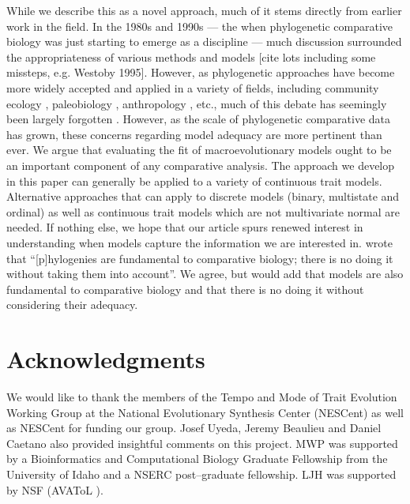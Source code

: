 \documentclass[a4paper,12pt]{article}
\begin{document}
While we describe this as a novel approach, much of it stems directly from earlier work in the field. In the 1980s and 1990s --- the when phylogenetic comparative biology was just starting to emerge as a discipline --- much discussion surrounded the appropriateness of various methods and models [cite lots including some missteps, e.g. Westoby 1995]. However, as phylogenetic approaches have become more widely accepted and applied in a variety of fields, including community ecology \citep{Webb2002, CB2009, Mayfield2010, PennellHarmon}, paleobiology \citep{Hunt2012}, anthropology \citep{Nunnbook}, etc., much of this debate has seemingly been largely forgotten \citep[but see][]{Losos2011}. However, as the scale of phylogenetic comparative data has grown, these concerns regarding model adequacy are more pertinent than ever. We argue that evaluating the fit of macroevolutionary models ought to be an important component of any comparative analysis. The approach we develop in this paper can generally be applied to a variety of continuous trait models. Alternative approaches that can apply to discrete models (binary, multistate and ordinal) as well as continuous trait models which are not multivariate normal are needed. If nothing else, we hope that our article spurs renewed interest in understanding when models capture the information we are interested in. \citet[][p. 14]{Felsenstein1985} wrote that ``[p]hylogenies are fundamental to comparative biology; there is no doing it without taking them into account''. We agree, but would add that models are also fundamental to comparative biology and that there is no doing it without considering their adequacy.


\section*{Acknowledgments}

We would like to thank the members of the Tempo and Mode of Trait Evolution Working Group at the National Evolutionary Synthesis Center (NESCent) as well as NESCent for funding our group. Josef Uyeda, Jeremy Beaulieu and Daniel Caetano also provided insightful comments on this project. MWP was supported by a Bioinformatics and Computational Biology Graduate Fellowship from the University of Idaho and a NSERC post--graduate fellowship. LJH was supported by NSF (AVAToL ).



\newpage


\end{document}
